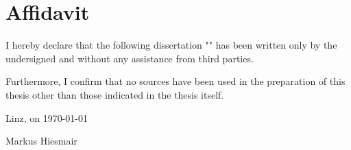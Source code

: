 \chapter*{Affidavit}

I hereby declare that the following dissertation "\thesistitle{}" has been written
only by the undersigned and without any assistance from third parties.

Furthermore, I confirm that no sources have been used in the preparation of this thesis other than those indicated in the thesis itself.

Linz, on \today

\hfill Markus Hiesmair
